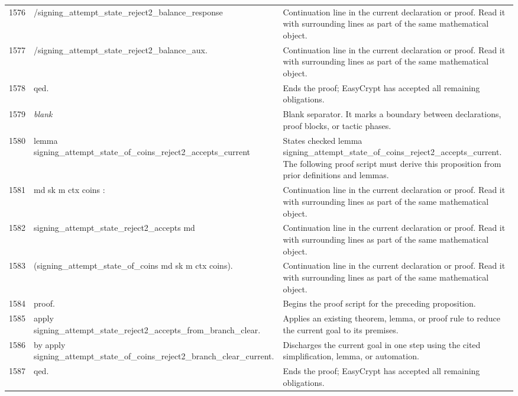 \documentclass[10pt]{article}
\begin{document}
\begin{longtable}{r L{0.53\textwidth} L{0.37\textwidth}}
1576 & {\ttfamily\scriptsize            /signing\_attempt\_state\_reject2\_balance\_response} & Continuation line in the current declaration or proof.  Read it with surrounding lines as part of the same mathematical object. \\
1577 & {\ttfamily\scriptsize            /signing\_attempt\_state\_reject2\_balance\_aux.} & Continuation line in the current declaration or proof.  Read it with surrounding lines as part of the same mathematical object. \\
1578 & {\ttfamily\scriptsize qed.} & Ends the proof; EasyCrypt has accepted all remaining obligations. \\
1579 & {\ttfamily\scriptsize \emph{blank}} & Blank separator.  It marks a boundary between declarations, proof blocks, or tactic phases. \\
1580 & {\ttfamily\scriptsize lemma signing\_attempt\_state\_of\_coins\_reject2\_accepts\_current} & States checked lemma signing\_attempt\_state\_of\_coins\_reject2\_accepts\_current.  The following proof script must derive this proposition from prior definitions and lemmas. \\
1581 & {\ttfamily\scriptsize    md sk m ctx coins :} & Continuation line in the current declaration or proof.  Read it with surrounding lines as part of the same mathematical object. \\
1582 & {\ttfamily\scriptsize   signing\_attempt\_state\_reject2\_accepts md} & Continuation line in the current declaration or proof.  Read it with surrounding lines as part of the same mathematical object. \\
1583 & {\ttfamily\scriptsize     (signing\_attempt\_state\_of\_coins md sk m ctx coins).} & Continuation line in the current declaration or proof.  Read it with surrounding lines as part of the same mathematical object. \\
1584 & {\ttfamily\scriptsize proof.} & Begins the proof script for the preceding proposition. \\
1585 & {\ttfamily\scriptsize apply signing\_attempt\_state\_reject2\_accepts\_from\_branch\_clear.} & Applies an existing theorem, lemma, or proof rule to reduce the current goal to its premises. \\
1586 & {\ttfamily\scriptsize by apply signing\_attempt\_state\_of\_coins\_reject2\_branch\_clear\_current.} & Discharges the current goal in one step using the cited simplification, lemma, or automation. \\
1587 & {\ttfamily\scriptsize qed.} & Ends the proof; EasyCrypt has accepted all remaining obligations. \\

\end{longtable}
\end{document}

